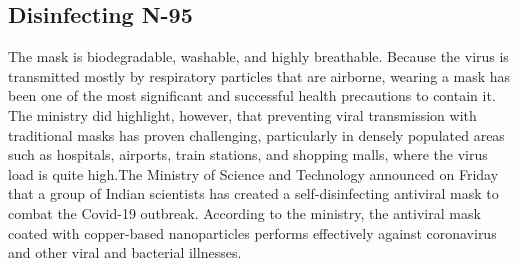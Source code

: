 \documentclass{article}
\begin{document}
\subsection{Disinfecting N-95}
The mask is biodegradable, washable, and highly breathable. Because the virus is transmitted mostly by respiratory particles that are
airborne, wearing a mask has been one of the most significant and successful health precautions to contain it. The ministry did highlight, however, that preventing viral transmission with traditional masks has proven challenging, particularly in densely populated areas such as hospitals, airports, train stations, and shopping malls, where the virus load is quite high.The Ministry of Science and Technology announced on Friday that a group of Indian scientists has created a self-disinfecting antiviral mask to combat the Covid-19 outbreak. According to the ministry, the antiviral mask coated with copper-based nanoparticles performs effectively against coronavirus and other viral and bacterial illnesses.

%
%
\end{document}
